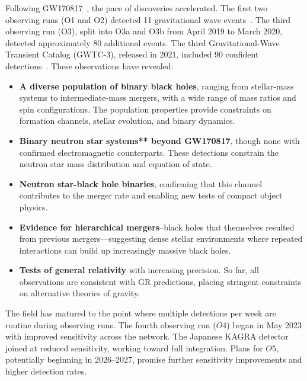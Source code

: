 Following GW170817~\cite{abbott_properties_2019}, the pace of discoveries accelerated.
The first two observing runs (O1 and O2) detected 11 gravitational wave events~\cite{abbott_gwtc1_2019}.
The third observing run (O3), split into O3a and O3b from April 2019 to March 2020, detected approximately 80 additional events.
The third Gravitational-Wave Transient Catalog (GWTC-3), released in 2021, included 90 confident detections~\cite{abbott_gwtc3_2023}.
These observations have revealed:
\begin{itemize}
    \item \textbf{A diverse population of binary black holes}, ranging from stellar-mass systems to intermediate-mass mergers, with a wide range of mass ratios and spin configurations.
    The population properties provide constraints on formation channels, stellar evolution, and binary dynamics.


    \item \textbf{Binary neutron star systems** beyond GW170817}, though none with confirmed electromagnetic counterparts.
    These detections constrain the neutron star mass distribution and equation of state.

    \item \textbf{Neutron star-black hole binaries}, confirming that this channel contributes to the merger rate and enabling new tests of compact object physics.

    \item \textbf{Evidence for hierarchical mergers}--black holes that themselves resulted from previous mergers—suggesting dense stellar environments where repeated interactions can build up increasingly massive black holes.

    \item \textbf{Tests of general relativity} with increasing precision.
    So far, all observations are consistent with GR predictions, placing stringent constraints on alternative theories of gravity.

\end{itemize}


The field has matured to the point where multiple detections per week are routine during observing runs.
The fourth observing run ($O4$) began in May 2023 with improved sensitivity across the network.
The Japanese KAGRA detector joined at reduced sensitivity, working toward full integration.
Plans for $O5$, potentially beginning in 2026--2027, promise further sensitivity improvements and higher detection rates.


